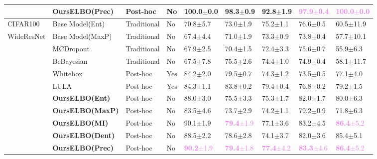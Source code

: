 \begin{table}[h]
\begin{center}
\begin{tabular}{lllllllll}
              & \textbf{OursELBO(Prec)} & Post-hoc & No & 100.0$\pm$0.0 & 98.3$\pm$0.9 & 92.8$\pm$1.9 &  \textcolor{violet}{\textbf{97.9$\pm$0.4}} & \textcolor{violet}{\textbf{100.0$\pm$0.0}}  \\
    \hline
    CIFAR100 & Base Model(Ent) & Traditional & No & 70.8$\pm$5.7 & 73.0$\pm$1.9 & 75.2$\pm$1.1 & 76.6$\pm$0.5 & 60.5$\pm$11.9  \\
    WideResNet   & Base Model(MaxP) & Traditional & No& 67.4$\pm$4.4 & 71.0$\pm$1.9 & 73.3$\pm$0.9 & 73.8$\pm$0.4 & 57.7$\pm$10.1   \\
              & MCDropout & Traditional & No & 67.9$\pm$2.5 & 70.4$\pm$1.5 & 72.4$\pm$3.3 & 75.6$\pm$0.7 & 55.9$\pm$6.3   \\
              & BeBayesian & Traditional & No & 67.5$\pm$7.8 & 75.5$\pm$2.6 & 74.4$\pm$1.0 & 74.9$\pm$0.4 & 58.1$\pm$11.7   \\
              & Whitebox & Post-hoc & Yes & 84.2$\pm$2.0 & 79.5$\pm$0.7 & 74.3$\pm$1.2 & 73.5$\pm$0.5 & 77.1$\pm$4.0   \\
              & LULA & Post-hoc & Yes & 84.3$\pm$1.1 & 83.8$\pm$0.2 & 79.4$\pm$0.4 & 76.8$\pm$0.2 & 79.2$\pm$1.5   \\
    \hline
              & \textbf{OursELBO(Ent)} & Post-hoc & No & 88.0$\pm$3.0 & 75.5$\pm$3.3 & 75.3$\pm$1.7 &  82.0$\pm$1.7& 80.0$\pm$6.3 \\
              & \textbf{OursELBO(MaxP)} & Post-hoc & No & 83.5$\pm$4.6 & 73.7$\pm$2.9 & 74.2$\pm$1.1 &  79.2$\pm$0.9& 71.8$\pm$6.3 \\
              & \textbf{OursELBO(MI)} & Post-hoc & No & 90.1$\pm$1.9 & \textcolor{violet}{\textbf{79.4}$\pm$1.9} & 77.1$\pm$3.6 &  83.2$\pm$4.5 & \textcolor{violet}{\textbf{86.4}$\pm$5.2} \\
              & \textbf{OursELBO(Dent)} & Post-hoc & No & 88.5$\pm$2.2 & 78.6$\pm$2.8 & 74.1$\pm$3.7 &  82.0$\pm$3.6& 85.4$\pm$5.1 \\
              & \textbf{OursELBO(Prec)} & Post-hoc & No & \textcolor{violet}{\textbf{90.2}$\pm$1.9} & \textcolor{violet}{\textbf{79.4}$\pm$1.8} & \textcolor{violet}{\textbf{77.4}$\pm$4.2} &  \textcolor{violet}{\textbf{83.3}$\pm$4.6}& \textcolor{violet}{\textbf{86.4}$\pm$5.2} \\
    \toprule
    
  \end{tabular}
  \label{table: OOD-aupr}
  \end{center}
  \vspace{-1.5em}
 \end{table}


